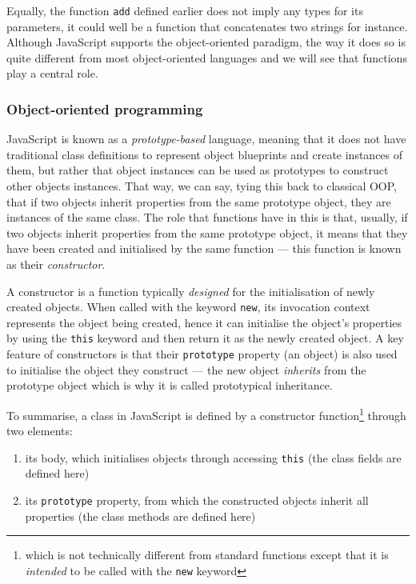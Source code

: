 Equally, the function \texttt{add} defined earlier does not imply any types for its parameters, it could well be a function that concatenates two strings for instance. Although JavaScript supports the object-oriented paradigm, the way it does so is quite different from most object-oriented languages and we will see that functions play a central role.

\subsubsection{Object-oriented programming}
\label{js}

JavaScript is known as a \emph{prototype-based} language, meaning that it does not have traditional class definitions to represent object blueprints and create instances of them, but rather that object instances can be used as prototypes to construct other objects instances. That way, we can say, tying this back to classical OOP, that if two objects inherit properties from the same prototype object, they are instances of the same class. The role that functions have in this is that, usually, if two objects inherit properties from the same prototype object, it means that they have been created and initialised by the same function --- this function is known as their \emph{constructor}.

A constructor is a function typically \emph{designed} for the initialisation of newly created objects. When called with the keyword \texttt{new}, its invocation context represents the object being created, hence it can initialise the object's properties by using the \texttt{this} keyword and then return it as the newly created object. A key feature of constructors is that their \texttt{prototype} property (an object) is also used to initialise the object they construct --- the new object \emph{inherits} from the prototype object which is why it is called prototypical inheritance.

To summarise, a class in JavaScript is defined by a constructor function\footnote{which is not technically different from standard functions except that it is \emph{intended} to be called with the \texttt{new} keyword} through two elements:

\begin{enumerate}
   \item its body, which initialises objects through accessing \texttt{this} (the class fields are defined here)
   \item its \texttt{prototype} property, from which the constructed objects inherit all properties (the class methods are defined here)
\end{enumerate}

